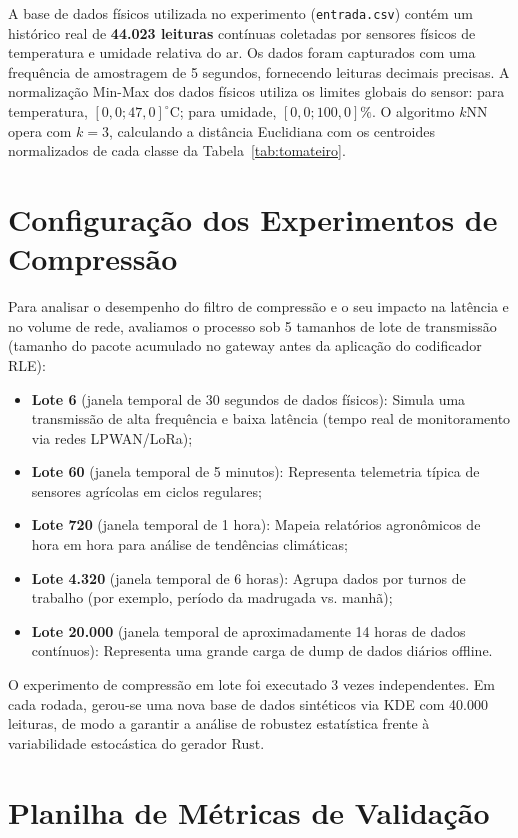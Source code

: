 \documentclass[
	12pt,
	openright,
	oneside,
	a4paper,
	english,
	brazil
	]{abntex2}
\begin{document}
A base de dados físicos utilizada no experimento (\texttt{entrada.csv}) contém um histórico real de \textbf{44.023 leituras} contínuas coletadas por sensores físicos de temperatura e umidade relativa do ar. Os dados foram capturados com uma frequência de amostragem de 5 segundos, fornecendo leituras decimais precisas. A normalização Min-Max dos dados físicos utiliza os limites globais do sensor: para temperatura, $[0,0; 47,0]^\circ\text{C}$; para umidade, $[0,0; 100,0]\%$. O algoritmo $k$NN opera com $k=3$, calculando a distância Euclidiana com os centroides normalizados de cada classe da Tabela~\ref{tab:tomateiro}.

\section{Configuração dos Experimentos de Compressão}

Para analisar o desempenho do filtro de compressão e o seu impacto na latência e no volume de rede, avaliamos o processo sob 5 tamanhos de lote de transmissão (tamanho do pacote acumulado no gateway antes da aplicação do codificador RLE):
\begin{itemize}
    \item \textbf{Lote 6} (janela temporal de 30 segundos de dados físicos): Simula uma transmissão de alta frequência e baixa latência (tempo real de monitoramento via redes LPWAN/LoRa);
    \item \textbf{Lote 60} (janela temporal de 5 minutos): Representa telemetria típica de sensores agrícolas em ciclos regulares;
    \item \textbf{Lote 720} (janela temporal de 1 hora): Mapeia relatórios agronômicos de hora em hora para análise de tendências climáticas;
    \item \textbf{Lote 4.320} (janela temporal de 6 horas): Agrupa dados por turnos de trabalho (por exemplo, período da madrugada vs. manhã);
    \item \textbf{Lote 20.000} (janela temporal de aproximadamente 14 horas de dados contínuos): Representa uma grande carga de dump de dados diários offline.
\end{itemize}

O experimento de compressão em lote foi executado 3 vezes independentes. Em cada rodada, gerou-se uma nova base de dados sintéticos via KDE com 40.000 leituras, de modo a garantir a análise de robustez estatística frente à variabilidade estocástica do gerador Rust.

\section{Planilha de Métricas de Validação}
\end{document}
